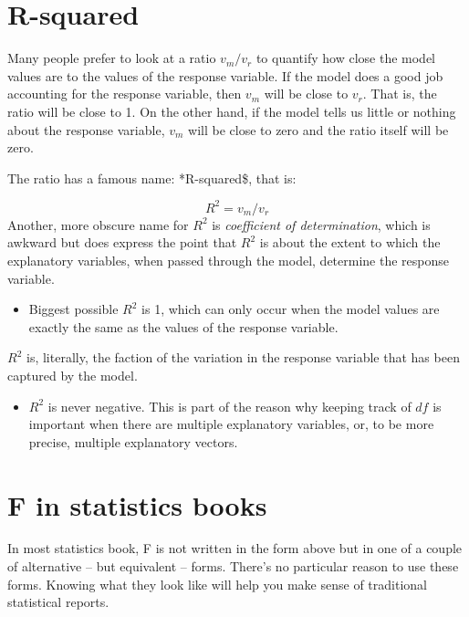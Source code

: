 \documentclass[]{book}
\providecommand{\tightlist}{%
  \setlength{\itemsep}{0pt}\setlength{\parskip}{0pt}}
\begin{document}
\hypertarget{r-squared}{%
\section{R-squared}\label{r-squared}}

Many people prefer to look at a ratio \(v_m / v_r\) to quantify how close the model values are to the values of the response variable. If the model does a good job accounting for the response variable, then \(v_m\) will be close to \(v_r\). That is, the ratio will be close to 1. On the other hand, if the model tells us little or nothing about the response variable, \(v_m\) will be close to zero and the ratio itself will be zero.

The ratio has a famous name: *R-squared\$, that is:

\[R^2 = v_m / v_r\]
Another, more obscure name for \(R^2\) is \emph{coefficient of determination}, which is awkward but does express the point that \(R^2\) is about the extent to which the explanatory variables, when passed through the model, determine the response variable.

\begin{itemize}
\tightlist
\item
  Biggest possible \(R^2\) is 1, which can only occur when the model values are exactly the same as the values of the response variable.
\end{itemize}

\(R^2\) is, literally, the faction of the variation in the response variable that has been captured by the model.

\begin{itemize}
\tightlist
\item
  \(R^2\) is never negative. This is part of the reason why keeping track of \(df\) is important when there are multiple explanatory variables, or, to be more precise, multiple explanatory vectors.
\end{itemize}

\hypertarget{f-in-statistics-books}{%
\section{F in statistics books}\label{f-in-statistics-books}}

In most statistics book, F is not written in the form above but in one of a couple of alternative -- but equivalent -- forms. There's no particular reason to use these forms. Knowing what they look like will help you make sense of traditional statistical reports.
\end{document}
